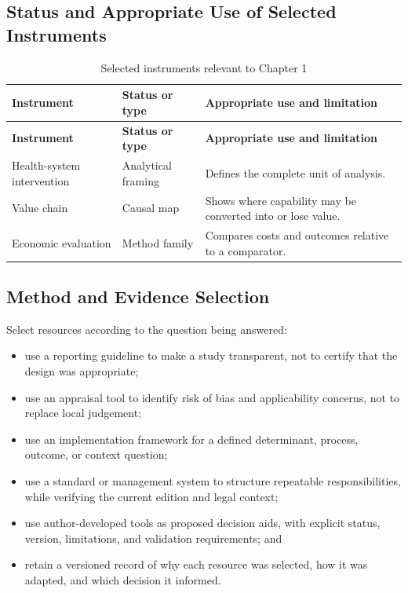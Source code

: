\subsection{Status and Appropriate Use of Selected Instruments}
\begin{longtable}{@{}p{}p{}p{}@{}}
\caption{Selected instruments relevant to Chapter 1}
\label{tab:comp-ch01-instrument-status}\\
\toprule
\textbf{Instrument} & \textbf{Status or type} & \textbf{Appropriate use and limitation} \\
\midrule
\endfirsthead
\toprule
\textbf{Instrument} & \textbf{Status or type} & \textbf{Appropriate use and limitation} \\
\midrule
\endhead
\bottomrule
\endlastfoot
Health-system intervention & Analytical framing & Defines the complete unit of analysis. \\
Value chain & Causal map & Shows where capability may be converted into or lose value. \\
Economic evaluation & Method family & Compares costs and outcomes relative to a comparator. \\
\end{longtable}

\subsection{Method and Evidence Selection}
Select resources according to the question being answered:
\begin{itemize}
 \item use a reporting guideline to make a study transparent, not to certify that the design was appropriate;
 \item use an appraisal tool to identify risk of bias and applicability concerns, not to replace local judgement;
 \item use an implementation framework for a defined determinant, process, outcome, or context question;
 \item use a standard or management system to structure repeatable responsibilities, while verifying the current edition and legal context;
 \item use author-developed tools as proposed decision aids, with explicit status, version, limitations, and validation requirements; and
 \item retain a versioned record of why each resource was selected, how it was adapted, and which decision it informed.
\end{itemize}

